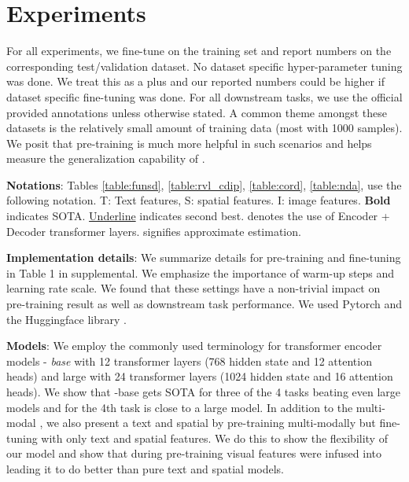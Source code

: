 \section{Experiments}
\label{section:experiments}



For all experiments, we fine-tune on the training set and report numbers on the corresponding test/validation dataset. No dataset specific hyper-parameter tuning was done. We treat this as a plus and our reported numbers could be higher if dataset specific fine-tuning was done. For all downstream tasks, we use the official provided annotations unless otherwise stated. A common theme amongst these datasets is the relatively small amount of training data (most with 1000 samples). We posit that pre-training is much more helpful in such scenarios and helps measure the generalization capability of \papertitle. 

\textbf{Notations}: Tables \ref{table:funsd}, \ref{table:rvl_cdip}, \ref{table:cord}, \ref{table:nda}, use the following notation. T: Text features, S: spatial features. I: image features. \textbf{Bold} indicates SOTA. \underline{Underline} indicates second best.  denotes the use of Encoder + Decoder transformer layers.  signifies approximate estimation.

\textbf{Implementation details}: We summarize details for pre-training and fine-tuning in Table 1 in supplemental. 
We emphasize the importance of warm-up steps and learning rate scale. 
We found that these settings have a non-trivial impact on pre-training result as well as downstream task performance. 
We used Pytorch \cite{paszke2019pytorch} and the Huggingface library \cite{wolf2019huggingface}.

\textbf{Models}: We employ the commonly used terminology for transformer encoder models - \textit{base} with 12 transformer layers (768 hidden state and 12 attention heads) and large with 24 transformer layers (1024 hidden state and 16 attention heads). We show that \papertitle-base gets SOTA for three of the 4 tasks beating even large models and for the 4th task is close to a large model. In addition to the multi-modal \papertitle, we also present a text and spatial \papertitle by pre-training \papertitle multi-modally but fine-tuning with only text and spatial features. We do this to show the flexibility of our model and show that during pre-training visual features were infused into \papertitle leading it to do better than pure text and spatial models.

